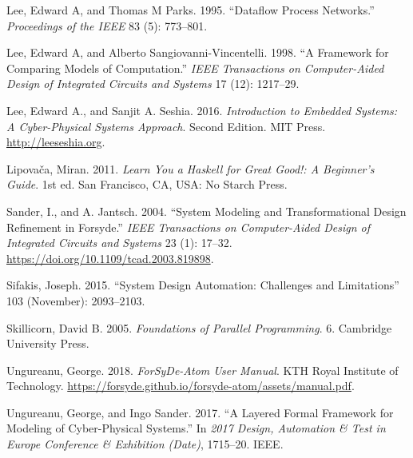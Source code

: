 \documentclass[
  a4paper,
]{article}
\begin{document}
\leavevmode\hypertarget{ref-lee95}{}%
Lee, Edward A, and Thomas M Parks. 1995. ``Dataflow Process Networks.''
\emph{Proceedings of the IEEE} 83 (5): 773--801.

\leavevmode\hypertarget{ref-lee98}{}%
Lee, Edward A, and Alberto Sangiovanni-Vincentelli. 1998. ``A Framework
for Comparing Models of Computation.'' \emph{IEEE Transactions on
Computer-Aided Design of Integrated Circuits and Systems} 17 (12):
1217--29.

\leavevmode\hypertarget{ref-leeseshia-15}{}%
Lee, Edward A., and Sanjit A. Seshia. 2016. \emph{Introduction to
Embedded Systems: A Cyber-Physical Systems Approach}. Second Edition.
MIT Press. \url{http://leeseshia.org}.

\leavevmode\hypertarget{ref-Lipovaca11}{}%
Lipovača, Miran. 2011. \emph{Learn You a Haskell for Great Good!: A
Beginner's Guide}. 1st ed. San Francisco, CA, USA: No Starch Press.

\leavevmode\hypertarget{ref-sander-2004}{}%
Sander, I., and A. Jantsch. 2004. ``System Modeling and Transformational
Design Refinement in Forsyde.'' \emph{IEEE Transactions on
Computer-Aided Design of Integrated Circuits and Systems} 23 (1):
17--32. \url{https://doi.org/10.1109/tcad.2003.819898}.

\leavevmode\hypertarget{ref-Sifakis15}{}%
Sifakis, Joseph. 2015. ``System Design Automation: Challenges and
Limitations'' 103 (November): 2093--2103.

\leavevmode\hypertarget{ref-skillicorn05}{}%
Skillicorn, David B. 2005. \emph{Foundations of Parallel Programming}.
6. Cambridge University Press.

\leavevmode\hypertarget{ref-atom-manual}{}%
Ungureanu, George. 2018. \emph{ForSyDe-Atom User Manual}. KTH Royal
Institute of Technology.
\url{https://forsyde.github.io/forsyde-atom/assets/manual.pdf}.

\leavevmode\hypertarget{ref-ungureanu17}{}%
Ungureanu, George, and Ingo Sander. 2017. ``A Layered Formal Framework
for Modeling of Cyber-Physical Systems.'' In \emph{2017 Design,
Automation \& Test in Europe Conference \& Exhibition (Date)}, 1715--20.
IEEE.
\end{document}
